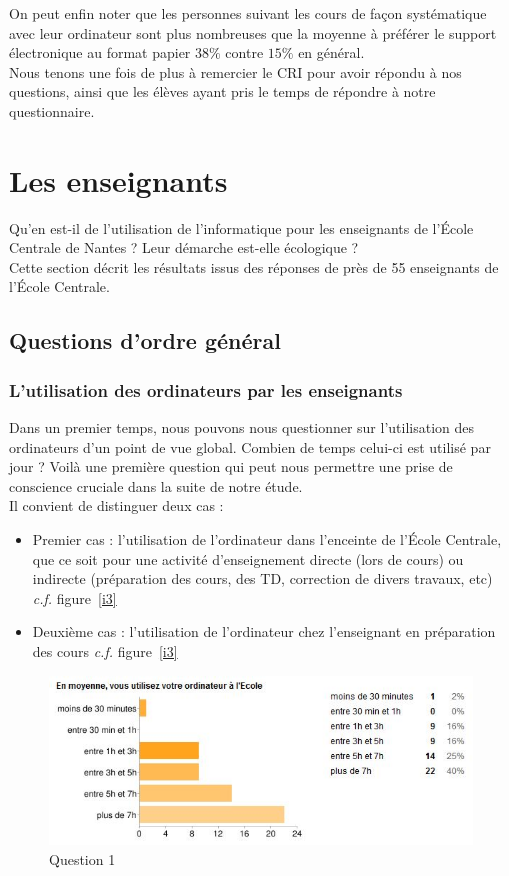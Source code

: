 \documentclass[a4paper,11pt,french]{article}
\begin{document}
On peut enfin noter que les personnes suivant les cours de façon systématique avec leur ordinateur sont plus nombreuses que la moyenne à préférer le support électronique au format papier $38\%$ contre $15\%$ en général.\\

Nous tenons une fois de plus à remercier le CRI pour avoir répondu à nos questions, ainsi que les élèves ayant pris le temps de répondre à notre questionnaire.


\section{Les enseignants}
Qu'en est-il de l'utilisation de l'informatique pour les enseignants de l'École Centrale de Nantes ? Leur démarche est-elle écologique ?\\

Cette section décrit les résultats issus des réponses de près de 55 enseignants de l'École Centrale.

\subsection{Questions d'ordre général}

\subsubsection{L’utilisation des ordinateurs par les enseignants}

Dans un premier temps, nous pouvons nous questionner sur l'utilisation des ordinateurs d'un point de vue global. Combien de temps celui-ci est utilisé par jour ? Voilà une première question qui peut nous permettre une prise de conscience cruciale dans la suite de notre étude.\\

Il convient de distinguer deux cas :
\begin{itemize}
\item Premier cas : l'utilisation de l'ordinateur dans l'enceinte de l'École Centrale, que ce soit pour une activité d'enseignement directe (lors de cours) ou indirecte (préparation des cours, des TD, correction de divers travaux, etc) \textit{c.f.} figure~\vref{i3}
\item Deuxième cas : l'utilisation de l'ordinateur chez l'enseignant en préparation des cours \textit{c.f.} figure~\vref{i3}
\end{itemize}

\begin{figure}[h!]
\includegraphics[width=\textwidth]{i6.PNG}
\caption{Question 1}
\label{i6}
\end{figure}
\end{document}
